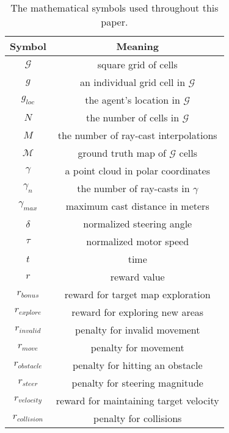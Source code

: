 \begingroup
\renewcommand{\arraystretch}{1.2}
\begin{table}[h]
\begin{center}
\caption{The mathematical symbols used throughout this paper.} 
\label{tab:symbol-table}  
\begin{tabular}{c|c}
\textbf{Symbol}   & \textbf{Meaning}                         \\ \hline
$\mathcal{G}$     & square grid of cells                     \\
$g$               & an individual grid cell in $\mathcal{G}$ \\
$g_{loc}$         & the agent's location in $\mathcal{G}$    \\
$N$               & the number of cells in $\mathcal{G}$     \\
$M$               & the number of ray-cast interpolations    \\
$\mathcal{M}$     & ground truth map of $\mathcal{G}$ cells  \\
$\gamma$          & a point cloud in polar coordinates       \\
$\gamma_n$        & the number of ray-casts in $\gamma$      \\
$\gamma_{max}$    & maximum cast distance in meters          \\
$\delta$          & normalized steering angle                \\
$\tau$            & normalized motor speed                   \\
$t$               & time                                     \\
$r$               & reward value                             \\
$r_{bonus}$       & reward for target map exploration        \\
$r_{explore}$     & reward for exploring new areas           \\
$r_{invalid}$     & penalty for invalid movement             \\
$r_{move}$        & penalty for movement                     \\
$r_{obstacle}$    & penalty for hitting an obstacle          \\
$r_{steer}$       & penalty for steering magnitude           \\
$r_{velocity}$    & reward for maintaining target velocity   \\
$r_{collision}$   & penalty for collisions                   \\

\end{tabular}
\end{center}
\end{table}
